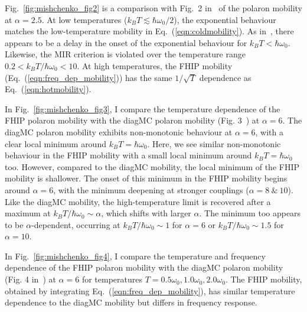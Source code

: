 Fig.~\ref{fig:mishchenko_fig2} is a comparison with Fig.~2 in~\cite{mishchenko_polaron_2019} of the polaron mobility at $\alpha = 2.5$. At low temperatures ($k_BT \lesssim \hbar\omega_0 / 2$), the exponential behaviour matches the low-temperature mobility in Eq.~(\ref{eqn:coldmobility}). As in~\cite{mishchenko_polaron_2019}, there appears to be a delay in the onset of the exponential behaviour for $k_BT < \hbar\omega_0$. Likewise, the MIR criterion is violated over the temperature range $0.2 < k_BT/\hbar\omega_0 < 10$. At high temperatures, the FHIP mobility (Eq.~(\ref{eqn:freq_dep_mobility})) has the same $1/\sqrt{T}$ dependence as Eq.~(\ref{eqn:hotmobility}).

In Fig.~\ref{fig:mishchenko_fig3}, I compare the temperature dependence of the FHIP polaron mobility with the diagMC polaron mobility (Fig. 3~\cite{mishchenko_polaron_2019}) at $\alpha = 6$. The diagMC polaron mobility exhibits non-monotonic behaviour at $\alpha = 6$, with a clear local minimum around $k_BT = \hbar\omega_0$. Here, we see similar non-monotonic behaviour in the FHIP mobility with a small local minimum around $k_B T = \hbar\omega_0$ too. However, compared to the diagMC mobility, the local minimum of the FHIP mobility is shallower. The onset of this minimum in the FHIP mobility begins around $\alpha = 6$, with the minimum deepening at stronger couplings ($\alpha = 8\ \&\ 10$). Like the diagMC mobility, the high-temperature limit is recovered after a maximum at $ k_B T /\hbar\omega_0 \sim \alpha$, which shifts with larger $\alpha$. The minimum too appears to be $\alpha$-dependent, occurring at $k_BT/\hbar\omega_0 \sim 1$ for $\alpha = 6$ or $k_BT/\hbar\omega_0 \sim 1.5$ for $\alpha = 10$.

In Fig.~\ref{fig:mishchenko_fig4}, I compare the temperature and frequency dependence of the FHIP polaron mobility with the diagMC polaron mobility (Fig. 4 in~\cite{mishchenko_polaron_2019}) at $\alpha = 6$ for temperatures $T = 0.5\omega_0, 1.0\omega_0, 2.0\omega_0$. The FHIP mobility, obtained by integrating Eq.~(\ref{eqn:freq_dep_mobility}), has similar temperature dependence to the diagMC mobility but differs in frequency response. 

